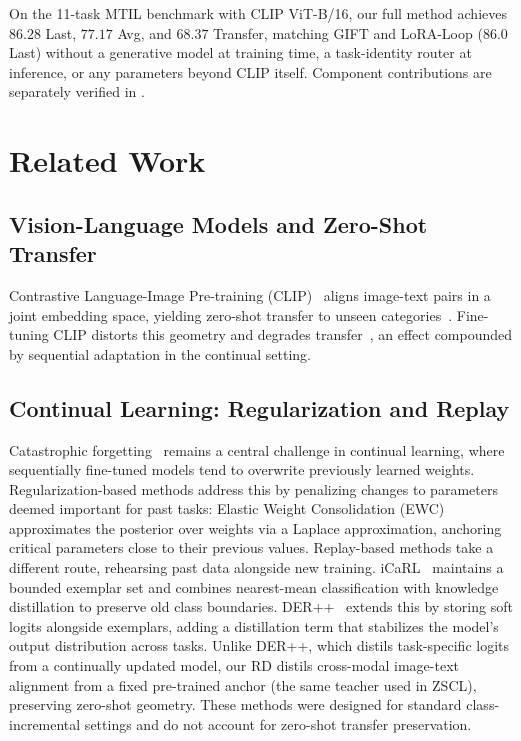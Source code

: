 \documentclass{article}
\let\cite\citep
\begin{document}
  On the 11-task MTIL benchmark with CLIP ViT-B/16, our full method achieves $86.28$ Last, $77.17$ Avg, and $68.37$ Transfer, matching GIFT and LoRA-Loop ($86.0$ Last) without a generative model at training time, a task-identity router at inference, or any parameters beyond CLIP itself. Component contributions are separately verified in .
  
\section{Related Work}

  \subsection{Vision-Language Models and Zero-Shot Transfer}
Contrastive Language-Image Pre-training (CLIP)~\cite{radford2021clip} aligns image-text pairs in a joint embedding space, yielding zero-shot transfer to unseen categories~\cite{lampert2009learning}. Fine-tuning CLIP distorts this geometry and degrades transfer~\cite{wortsman2022wiseft}, an effect compounded by sequential adaptation in the continual setting. \subsection{Continual Learning: Regularization and Replay} Catastrophic forgetting~\cite{mccloskey1989catastrophic} remains a central challenge in continual learning, where sequentially fine-tuned models tend to overwrite previously learned weights. Regularization-based methods address this by penalizing changes to parameters deemed important for past tasks: Elastic Weight Consolidation (EWC)~\cite{kirkpatrick2017ewc} approximates the posterior over weights via a
  Laplace approximation, anchoring critical parameters close to their previous
  values. Replay-based methods take a different route, rehearsing past data
  alongside new training. iCaRL~\cite{rebuffi2017icarl} maintains a bounded
  exemplar set and combines nearest-mean classification with knowledge distillation
  to preserve old class boundaries. DER++~\cite{buzzega2020dark} extends this by
  storing soft logits alongside exemplars, adding a distillation term that
  stabilizes the model's output distribution across tasks. Unlike DER++, which distils task-specific logits from a continually updated model, our RD distils cross-modal image-text alignment from a fixed pre-trained anchor (the same teacher used in ZSCL), preserving zero-shot geometry.  These methods were designed for standard class-incremental settings and do not account for zero-shot
  transfer preservation.
\end{document}
